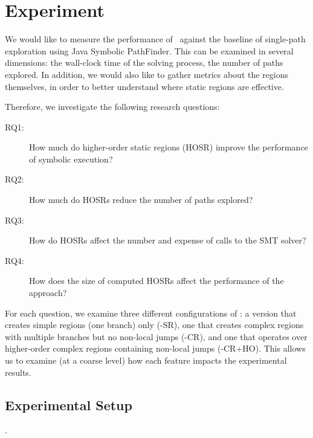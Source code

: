 \section{Experiment}

We would like to measure the performance of \tool\ against the baseline of single-path exploration using Java Symbolic PathFinder.  This can be examined in several dimensions: the wall-clock time of the solving process, the number of paths explored.  In addition, we would also like to gather metrics about the regions themselves, in order to better understand where static regions are effective.

Therefore, we investigate the following research questions:

\begin{description}
\item[RQ1:] How much do higher-order static regions (HOSR) improve the performance of symbolic execution?
\item[RQ2:] How much do HOSRs reduce the number of paths explored?
\item[RQ3:] How do HOSRs affect the number and expense of calls to the SMT solver?
\item[RQ4:] How does the size of computed HOSRs affect the performance of the approach?
\end{description}

For each question, we examine three different configurations of \tool: a version that creates simple regions (one branch) only (\tool-SR), one that creates complex regions with multiple branches but no non-local jumps (\tool-CR), and one that operates over higher-order complex regions containing non-local jumps (\tool-CR+HO).  This allows us to examine (at a coarse level) how each feature impacts the experimental results.

\subsection{Experimental Setup}


. 